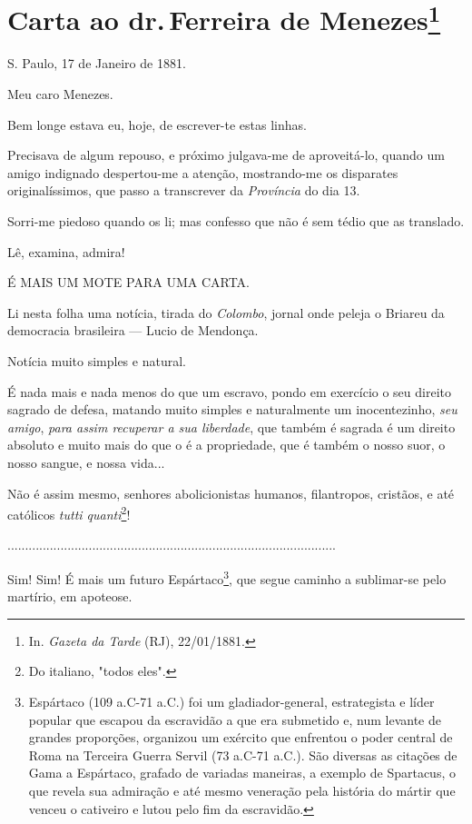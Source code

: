 \chapter{Carta ao dr.\,Ferreira de Menezes\footnote[*]{In.
  \emph{Gazeta da Tarde} (RJ), 22/01/1881.}}


S. Paulo, 17 de Janeiro de 1881.

Meu caro Menezes.

Bem longe estava eu, hoje, de escrever-te estas linhas.

Precisava de algum repouso, e próximo julgava-me de aproveitá-lo, quando
um amigo indignado despertou-me a atenção, mostrando-me os disparates
originalíssimos, que passo a transcrever da \emph{Província} do dia 13.

Sorri-me piedoso quando os li; mas confesso que não é sem tédio que as
translado.

Lê, examina, admira!

É MAIS UM MOTE PARA UMA CARTA.

Li nesta folha uma notícia, tirada do \emph{Colombo}, jornal onde peleja
o Briareu da democracia brasileira --- Lucio de Mendonça.

Notícia muito simples e natural.

É nada mais e nada menos do que um escravo, pondo em exercício o seu
direito sagrado de defesa, matando muito simples e naturalmente um
inocentezinho, \emph{seu amigo}, \emph{para assim recuperar a sua
liberdade}, que também é sagrada é um direito absoluto e muito mais do
que o é a propriedade, que é também o nosso suor, o nosso sangue, e
nossa vida...

Não é assim mesmo, senhores abolicionistas humanos, filantropos,
cristãos, e até católicos \emph{tutti quanti}\footnote{Do italiano,
  "todos eles".}!

.............................................................................................

Sim! Sim! É mais um futuro Espártaco\footnote{Espártaco (109 a.C-71
  a.C.) foi um gladiador-general, estrategista e líder popular que
  escapou da escravidão a que era submetido e, num levante de grandes
  proporções, organizou um exército que enfrentou o poder central de
  Roma na Terceira Guerra Servil (73 a.C-71 a.C.). São diversas as
  citações de Gama a Espártaco, grafado de variadas maneiras, a exemplo
  de Spartacus, o que revela sua admiração e até mesmo veneração pela
  história do mártir que venceu o cativeiro e lutou pelo fim da
  escravidão.}, que segue caminho a sublimar-se pelo martírio, em
apoteose.

